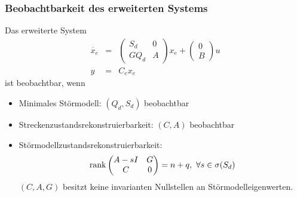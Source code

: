 \subsubsection{Beobachtbarkeit des erweiterten Systems}
Das erweiterte System
\begin{eqnarray}
    \dot{x_e} &=& \begin{pmatrix}
            S_d & 0 \\
            G Q_d & A
        \end{pmatrix}
        x_e +
        \begin{pmatrix} 0 \\ B \end{pmatrix} u \\
    y &=& C_e x_e
\end{eqnarray}
ist beobachtbar, wenn
\begin{itemize}
    \item Minimales Störmodell: $(Q_d, S_d)$ beobachtbar
    \item Streckenzustandsrekonstruierbarkeit: $(C, A)$ beobachtbar
    \item Störmodellzustandsrekonstruierbarkeit:
        \begin{equation}
            \operatorname*{rank} \begin{pmatrix} 
                    A-sI & G \\
                    C & 0
                \end{pmatrix}
            = n + q,\ \forall s \in \sigma(S_d)
        \end{equation}
        $(C, A, G)$ besitzt keine invarianten Nullstellen an Störmodelleigenwerten.
\end{itemize}

